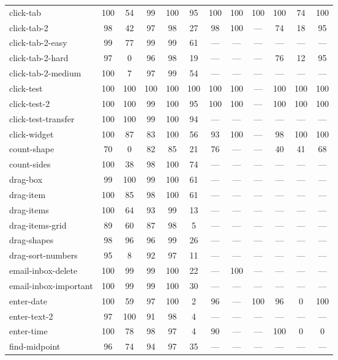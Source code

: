 \begin{table}[t!]
{\begin{tabular}{lccccccccccc}
click-tab & 100 & 54 & 99 & 100 & 95 & 100 & 100 & 100 & 100 & 74 & 100 \\
click-tab-2 & 98 & 42 & 97 & 98 & 27 & 98 & 100 & --- & 74 & 18 & 95 \\
click-tab-2-easy & 99 & 77 & 99 & 99 & 61 & --- & --- & --- & --- & --- & --- \\
click-tab-2-hard & 97 & 0 & 96 & 98 & 19 & --- & --- & --- & 76 & 12 & 95 \\
click-tab-2-medium & 100 & 7 & 97 & 99 & 54 & --- & --- & --- & --- & --- & --- \\
click-test & 100 & 100 & 100 & 100 & 100 & 100 & 100 & --- & 100 & 100 & 100 \\
click-test-2 & 100 & 100 & 99 & 100 & 95 & 100 & 100 & --- & 100 & 100 & 100 \\
click-test-transfer & 100 & 100 & 99 & 100 & 94 & --- & --- & --- & --- & --- & --- \\
click-widget & 100 & 87 & 83 & 100 & 56 & 93 & 100 & --- & 98 & 100 & 100 \\
count-shape & 70 & 0 & 82 & 85 & 21 & 76 & --- & --- & 40 & 41 & 68 \\
count-sides & 100 & 38 & 98 & 100 & 74 & --- & --- & --- & --- & --- & --- \\
drag-box & 99 & 100 & 99 & 100 & 61 & --- & --- & --- & --- & --- & --- \\
drag-item & 100 & 85 & 98 & 100 & 61 & --- & --- & --- & --- & --- & --- \\
drag-items & 100 & 64 & 93 & 99 & 13 & --- & --- & --- & --- & --- & --- \\
drag-items-grid & 89 & 60 & 87 & 98 & 5 & --- & --- & --- & --- & --- & --- \\
drag-shapes & 98 & 96 & 96 & 99 & 26 & --- & --- & --- & --- & --- & --- \\
drag-sort-numbers & 95 & 8 & 92 & 97 & 11 & --- & --- & --- & --- & --- & --- \\
email-inbox-delete & 100 & 99 & 99 & 100 & 22 & --- & 100 & --- & --- & --- & --- \\
email-inbox-important & 100 & 99 & 99 & 100 & 30 & --- & --- & --- & --- & --- & --- \\
enter-date & 100 & 59 & 97 & 100 & 2 & 96 & --- & 100 & 96 & 0 & 100 \\
enter-text-2 & 97 & 100 & 91 & 98 & 4 & --- & --- & --- & --- & --- & --- \\
enter-time & 100 & 78 & 98 & 97 & 4 & 90 & --- & --- & 100 & 0 & 0 \\
find-midpoint & 96 & 74 & 94 & 97 & 35 & --- & --- & --- & --- & --- & --- \\

\end{tabular}}
\end{table}
